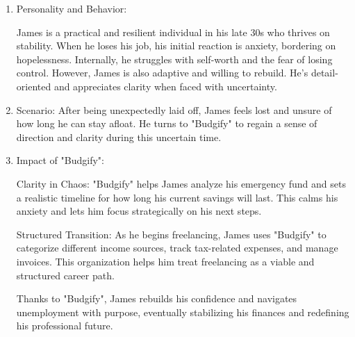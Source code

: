 \documentclass[a4paper,12pt]{article}
\begin{document}
\begin{enumerate}
    \item Personality and Behavior:
    
    James is a practical and resilient individual in his late 30s who thrives on stability. When he loses his job, his initial reaction is anxiety, bordering on hopelessness. Internally, he struggles with self-worth and the fear of losing control. However, James is also adaptive and willing to rebuild. He's detail-oriented and appreciates clarity when faced with uncertainty.
    
    \item Scenario:
    After being unexpectedly laid off, James feels lost and unsure of how long he can stay afloat. He turns to "Budgify" to regain a sense of direction and clarity during this uncertain time.
    
    \item Impact of "Budgify":
    
    Clarity in Chaos: "Budgify" helps James analyze his emergency fund and sets a realistic timeline for how long his current savings will last. This calms his anxiety and lets him focus strategically on his next steps.
    
    Structured Transition: As he begins freelancing, James uses "Budgify" to categorize different income sources, track tax-related expenses, and manage invoices. This organization helps him treat freelancing as a viable and structured career path.
    
    Thanks to "Budgify", James rebuilds his confidence and navigates unemployment with purpose, eventually stabilizing his finances and redefining his professional future.

\end{enumerate}
\end{document}
